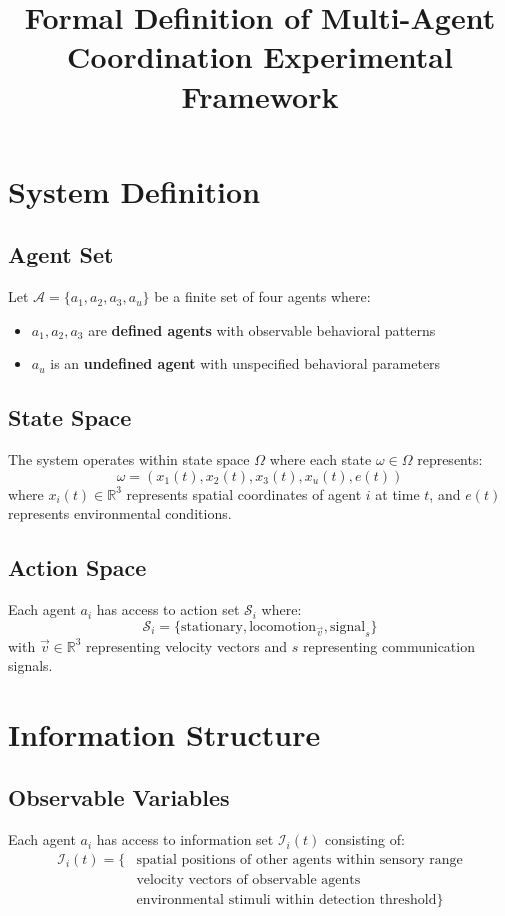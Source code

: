 \documentclass{article}
\title{Formal Definition of Multi-Agent Coordination Experimental Framework}
\author{}
\date{}
\begin{document}
\maketitle

\section{System Definition}

\subsection{Agent Set}
Let $\mathcal{A} = \{a_1, a_2, a_3, a_u\}$ be a finite set of four agents where:
\begin{itemize}
    \item $a_1, a_2, a_3$ are \textbf{defined agents} with observable behavioral patterns
    \item $a_u$ is an \textbf{undefined agent} with unspecified behavioral parameters
\end{itemize}

\subsection{State Space}
The system operates within state space $\Omega$ where each state $\omega \in \Omega$ represents:
$$\omega = (x_1(t), x_2(t), x_3(t), x_u(t), e(t))$$
where $x_i(t) \in \mathbb{R}^3$ represents spatial coordinates of agent $i$ at time $t$, and $e(t)$ represents environmental conditions.

\subsection{Action Space}
Each agent $a_i$ has access to action set $\mathcal{S}_i$ where:
$$\mathcal{S}_i = \{\text{stationary}, \text{locomotion}_{\vec{v}}, \text{signal}_s\}$$
with $\vec{v} \in \mathbb{R}^3$ representing velocity vectors and $s$ representing communication signals.

\section{Information Structure}

\subsection{Observable Variables}
Each agent $a_i$ has access to information set $\mathcal{I}_i(t)$ consisting of:
\begin{align}
\mathcal{I}_i(t) = \{&\text{spatial positions of other agents within sensory range} \nonumber \\
&\text{velocity vectors of observable agents} \nonumber \\
&\text{environmental stimuli within detection threshold}\}
\end{align}
\end{document}
